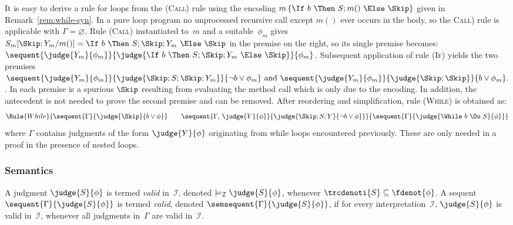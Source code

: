 \documentclass[a4paper,numberwithinsect]{lipics-v2021}
\begin{document}
\begin{remark}\label{rem:while-rule}
  It is easy to derive a rule for loops from the (\textsc{Call}) rule
  using the encoding $m\,\{\If\ b\ \Then\ S;m()\ \Else\ \Skip\}$ given
  in Remark~\ref{rem:while-syn}. In a pure loop program no unprocessed
  recursive call except $m()$ ever occurs in the body, so the
  \textsc{Call}) rule is applicable with $\Gamma=\varnothing$.  Rule
  (\textsc{Call}) instantiated to~$m$ and a suitable~$\phi_m$ gives
  $ S_m[\Skip;Y_m/m()]=\If\ b\ \Then\ S;\Skip;Y_m\ \Else\ \Skip $ in
  the premise on the right, so its single premise becomes:
  $ \sequent{\judge{Y_m}{\phi_m}}{\judge{\If\ b\ \Then\ S;\Skip;Y_m\
      \Else\ \Skip}}{\phi_m} $.  Subsequent application of rule
  (\textsc{If}) yields the two premises
  $ \sequent{\judge{Y_m}{\phi_m}}{\judge{\Skip;S;\Skip;Y_m}}{\lnot
    b\lor\phi_m} \text{ and }
  \sequent{\judge{Y_m}{\phi_m}}{\judge{\Skip;\Skip}}{b\lor\phi_m}.  $.
  In each premise is a spurious $\Skip$ resulting from evaluating the
  method call which is only due to the encoding. In addition, the
  antecedent is not needed to prove the second premise and can be
  removed. After reordering and simplification, rule (\textsc{While})
  is obtained as:
  \[
    \Rule{While}
    {\sequent{\Gamma}{\judge{\Skip}{b \lor \phi}}\qquad
      \sequent{\Gamma,\, \judge{Y}{\phi}}
      {\judge{\Skip; S; Y}{\lnot b \lor \phi}}}
    {\sequent{\Gamma}{\judge{\While\ b\ \Do\ S}{\phi}}}
  \]
  where $\Gamma$ contains judgments of the form $\judge{Y}{\phi}$
  originating from while loops encountered previously. These are only
  needed in a proof in the presence of nested loops.
\end{remark}


\subsubsection{Semantics}

\begin{definition}
  \label{def:calculus-semantics}
  A judgment $\judge{S}{\phi}$ is termed \emph{valid}
  in~$\mathcal{I}$, denoted $\models_\mathcal{I} \judge{S}{\phi}$,
  whenever $\trcdenoti{S} \subseteq \fdenot{\phi}$.
  A sequent $\sequent{\Gamma}{\judge{S}{\phi}}$ is termed
  \emph{valid}, denoted $\semsequent{\Gamma}{\judge{S}{\phi}}$, if for
  every inter\-pretation~$\mathcal{I}$, $\judge{S}{\phi}$ is valid
  in~$\mathcal{I}$, whenever all judgments in~$\Gamma$ are valid
  in~$\mathcal{I}$.
\end{definition}
\end{document}
